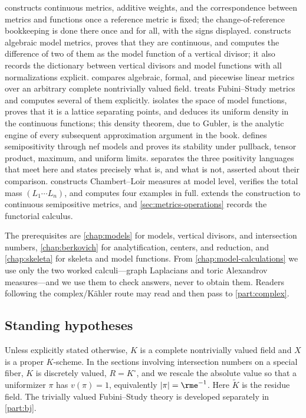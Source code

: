  constructs continuous metrics, additive
weights, and the correspondence between metrics and functions once a
reference metric is fixed; the change-of-reference bookkeeping is done there
once and for all, with the signs displayed.
 constructs algebraic model metrics, proves that
they are continuous, and computes the difference of two of them as the model
function of a vertical divisor; it also records the dictionary between
vertical divisors and model functions with all normalizations explicit.
 compares algebraic, formal, and piecewise
linear metrics over an arbitrary complete nontrivially valued field.
 treats Fubini--Study metrics and computes several of
them explicitly.
 isolates the space of model functions,
proves that it is a lattice separating points, and deduces its uniform
density in the continuous functions; this density theorem, due to Gubler, is
the analytic engine of every subsequent approximation argument in the book.
 defines semipositivity through nef models
and proves its stability under pullback, tensor product, maximum, and
uniform limits.
 separates the three positivity
languages that meet here and states precisely what is, and what is not,
asserted about their comparison.
 constructs Chambert--Loir measures at model
level, verifies the total mass $(L_1\cdots L_n)$, and computes four
examples in full.
 extends the construction to continuous
semipositive metrics, and \cref{sec:metrics-operations} records the
functorial calculus.

The prerequisites are \cref{chap:models} for models, vertical divisors, and
intersection numbers, \cref{chap:berkovich} for analytification, centers,
and reduction, and \cref{chap:skeleta} for skeleta and model functions. From
\cref{chap:model-calculations} we use only the two worked calculi---graph
Laplacians and toric Alexandrov measures---and we use them to check answers,
never to obtain them. Readers following the complex/Kähler route may read
 and then pass to
\cref{part:complex}.

\subsection*{Standing hypotheses}

Unless explicitly stated otherwise, $K$ is a complete nontrivially valued
field and $X$ is a proper $K$-scheme. In the sections involving
intersection numbers on a special fiber, $K$ is discretely valued,
$R=K^\circ$, and we rescale the absolute value so that a uniformizer
$\pi$ has $v(\pi)=1$, equivalently $|\pi|=\rme^{-1}$. Here
$\widetilde K$ is the residue field. The trivially valued Fubini--Study
theory is developed separately in \cref{part:bj}.

